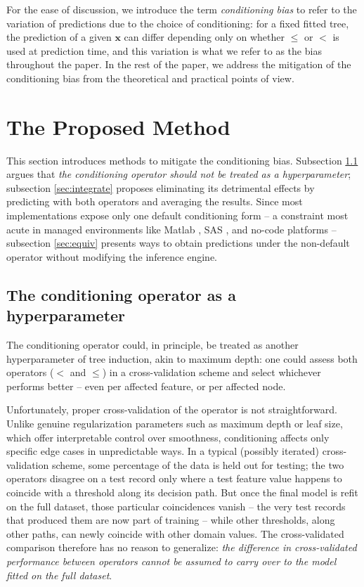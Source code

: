\documentclass[5p,twocolumn,authoryear]{elsarticle}
\theoremstyle{plain}%
\theoremstyle{remark}%
\theoremstyle{definition}%
\begin{document}
For the ease of discussion, we introduce the term \emph{conditioning bias} to refer to the variation of predictions due to the choice of conditioning: for a fixed fitted tree, the prediction of a given $\mathbf{x}$ can differ depending only on whether $\leq$ or $<$ is used at prediction time, and this variation is what we refer to as the bias throughout the paper.
In the rest of the paper, we address the mitigation of the conditioning bias from the theoretical and practical points of view.

\section{The Proposed Method}
\label{sec:proposed}

This section introduces methods to mitigate the conditioning bias. Subsection \ref{sec:hyper} argues that \emph{the conditioning operator should not be treated as a hyperparameter}; subsection \ref{sec:integrate} proposes eliminating its detrimental effects by predicting with both operators and averaging the results. Since most implementations expose only one default conditioning form -- a constraint most acute in managed environments like Matlab \citep{matlab}, SAS \citep{sas}, and no-code platforms \citep{nocode} -- subsection \ref{sec:equiv} presents ways to obtain predictions under the non-default operator without modifying the inference engine.

\subsection{The conditioning operator as a hyperparameter}
\label{sec:hyper}

The conditioning operator could, in principle, be treated as another hyperparameter of tree induction, akin to maximum depth: one could assess both operators ($<$ and $\leq$) in a cross-validation scheme and select whichever performs better -- even per affected feature, or per affected node.

Unfortunately, proper cross-validation of the operator is not straightforward. Unlike genuine regularization parameters such as maximum depth or leaf size, which offer interpretable control over smoothness, conditioning affects only specific edge cases in unpredictable ways. In a typical (possibly iterated) cross-validation scheme, some percentage of the data is held out for testing; the two operators disagree on a test record only where a test feature value happens to coincide with a threshold along its decision path. But once the final model is refit on the full dataset, those particular coincidences vanish -- the very test records that produced them are now part of training -- while other thresholds, along other paths, can newly coincide with other domain values. The cross-validated comparison therefore has no reason to generalize: \emph{the difference in cross-validated performance between operators cannot be assumed to carry over to the model fitted on the full dataset}.
\end{document}
